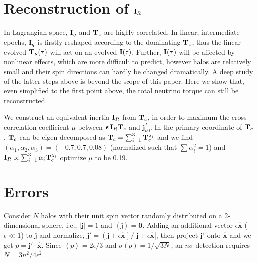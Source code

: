 \documentclass[aps,prd,twocolumn,amsmath,amssymb,amsfont,superscriptaddress,nofootinbib]{revtex4-1}
\newcommand{\bs}{\boldsymbol}
\newcommand{\T}{\bold{T}}
\newcommand{\I}{\bold{I}}
\newcommand{\spin}{\bs{j}}
\begin{document}

\appendix
\section{Reconstruction of $\I_R$}\label{app.I}
In Lagrangian space, $\I_q$ and $\T_c$ are highly correlated.
In linear, intermediate epochs, $\I_q$ is firstly reshaped according to the dominating $\T_c$, thus the linear evolved $\T_\nu(\tau)$ will act on an evolved $\I(\tau)$.
Further, $\I(\tau)$ will be affected by nonlinear effects, which are more difficult to predict, however halos are relatively small and their spin directions can hardly be changed dramatically.
A deep study of the latter steps above is beyond the scope of this paper. Here we show that, even simplified to the first point above, the total neutrino torque can still be reconstructed.

We construct an equivalent inertia $\I_R$ from $\T_c$, in order to maximum the cross-correlation coefficient $\mu$ between $\bs{\epsilon}\,\I_R\T_\nu$ and $\spin^I_{\nu 0}$.
In the primary coordinate of $\T_c$, $\T_c$ can be eigen-decomposed as $\T_c=\sum_{i=1}^3\T^{\lambda_i}_c$ and we find $(\alpha_1,\alpha_2,\alpha_3)=(-0.7,0.7,0.08)$ (normalized such that $\sum \alpha_i^2=1$) and $\I_R\propto\sum_{i=1}^3\alpha_i\T^{\lambda_i}_c$
optimize $\mu$ to be 0.19.


\section{Errors}\label{app.error}
Consider $N$ halos with their unit spin vector randomly distributed on a 2-dimensional sphere, i.e., $|\spin|=1$ and $\left\langle \spin \right\rangle =\bs{0}$. Adding an additional vector $\epsilon\hat{\bs{x}}$ ($\epsilon\ll 1$) to $\spin$ and normalize, $\spin'=(\spin+\epsilon\hat{\bs{x}})/|\spin+\epsilon\hat{\bs{x}}|$, then project $\spin'$ onto $\hat{\bs{x}}$ and we get $p=\spin'\cdot\hat{\bs{x}}$. Since $\left\langle p \right\rangle=2\epsilon/3$ and $\sigma(p)=1/\sqrt{3N}$, an $n\sigma$ detection requires $N=3n^2/4\epsilon^2$.





\end{document}

